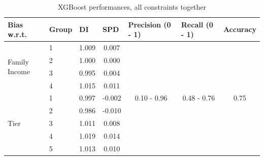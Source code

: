 \documentclass{article}
\begin{document}
\begin{table}[H]
\caption{XGBoost performances, all constraints together}
\begin{tabular}{llcc|ccc}
\hline
Bias w.r.t.                    & Group & \multicolumn{1}{l}{DI} & \multicolumn{1}{l}{SPD}    & \multicolumn{1}{l}{Precision (0 - 1)} & \multicolumn{1}{l}{Recall (0 - 1)} & \multicolumn{1}{l}{Accuracy} \\
\hline
\multirow{4}{*}{Family Income} & 1     & 1.009                  & 0.007                      & \multirow{13}{*}{0.10 - 0.96}         & \multirow{13}{*}{0.48 - 0.76}      & \multirow{13}{*}{0.75}       \\
                               & 2     & 1.000                  & 0.000                      &                                       &                                    &                              \\
                               & 3     & 0.995                  & 0.004                      &                                       &                                    &                              \\
                               & 4     & 1.015                  & 0.011                      &                                       &                                    &                              \\
\hline
\multirow{5}{*}{Tier}          & 1     & 0.997                  & -0.002                     &                                       &                                    &                              \\
                               & 2     & 0.986                  & -0.010                     &                                       &                                    &                              \\
                               & 3     & 1.011                  & 0.008                      &                                       &                                    &                              \\
                               & 4     & 1.019                  & 0.014                      &                                       &                                    &                              \\
                               & 5     & 1.013                  & 0.010                      &                                       &                                    &                              \\

\end{tabular}
\end{table}
\end{document}
